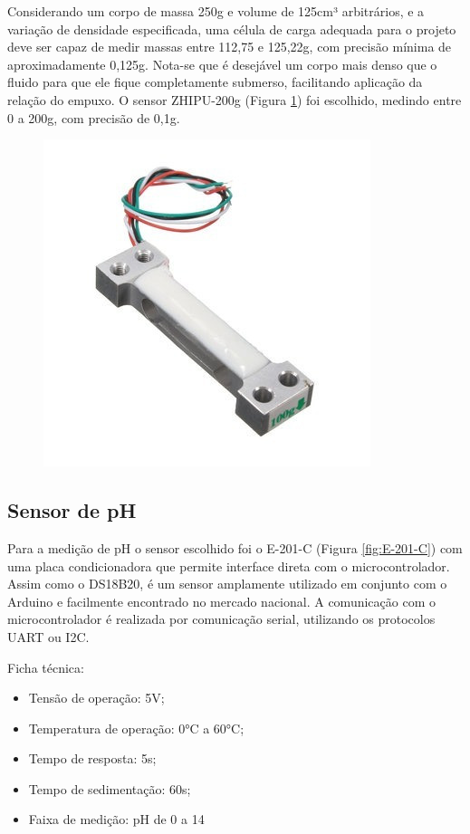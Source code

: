 Considerando um corpo de massa 250g e volume de 125cm³ arbitrários, e a variação de densidade especificada, uma célula de carga adequada para o projeto deve ser capaz de medir massas entre 112,75 e 125,22g, com precisão mínima de aproximadamente 0,125g. Nota-se que é desejável um corpo mais denso que o fluido para que ele fique completamente submerso, facilitando aplicação da relação do empuxo. O sensor ZHIPU-200g (Figura \ref{fig:ZHIPU-200g}) foi escolhido, medindo entre 0 a 200g, com precisão de 0,1g.


\begin{figure}[h]
    \centering
    \includegraphics[scale=0.40]{figuras/projeto/hardware/ZHIPU-200g.jpg}
    \label{fig:ZHIPU-200g}
\end{figure}


\subsection{Sensor de pH}

Para a medição de pH o sensor escolhido foi o E-201-C (Figura \ref{fig:E-201-C}) com uma placa condicionadora que permite interface direta com o microcontrolador. Assim como o DS18B20, é um sensor amplamente utilizado em conjunto com o Arduino e facilmente encontrado no mercado nacional. A comunicação com o microcontrolador é realizada por comunicação serial, utilizando os protocolos UART ou I2C.


Ficha técnica:
\begin{itemize}
    \item Tensão de operação: 5V;
    \item Temperatura de operação: 0°C a 60°C;
    \item Tempo de resposta: 5s;
    \item Tempo de sedimentação: 60s;
    \item Faixa de medição: pH de 0 a 14
\end{itemize}

